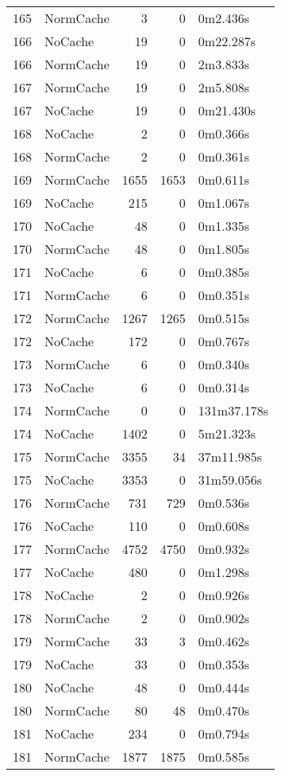 \begin{tabular}{llrrl}
165 & NormCache & 3 & 0 & 0m2.436s \\
166 & NoCache & 19 & 0 & 0m22.287s \\
166 & NormCache & 19 & 0 & 2m3.833s \\
167 & NormCache & 19 & 0 & 2m5.808s \\
167 & NoCache & 19 & 0 & 0m21.430s \\
168 & NoCache & 2 & 0 & 0m0.366s \\
168 & NormCache & 2 & 0 & 0m0.361s \\
169 & NormCache & 1655 & 1653 & 0m0.611s \\
169 & NoCache & 215 & 0 & 0m1.067s \\
170 & NoCache & 48 & 0 & 0m1.335s \\
170 & NormCache & 48 & 0 & 0m1.805s \\
171 & NoCache & 6 & 0 & 0m0.385s \\
171 & NormCache & 6 & 0 & 0m0.351s \\
172 & NormCache & 1267 & 1265 & 0m0.515s \\
172 & NoCache & 172 & 0 & 0m0.767s \\
173 & NormCache & 6 & 0 & 0m0.340s \\
173 & NoCache & 6 & 0 & 0m0.314s \\
174 & NormCache & 0 & 0 & 131m37.178s \\
174 & NoCache & 1402 & 0 & 5m21.323s \\
175 & NormCache & 3355 & 34 & 37m11.985s \\
175 & NoCache & 3353 & 0 & 31m59.056s \\
176 & NormCache & 731 & 729 & 0m0.536s \\
176 & NoCache & 110 & 0 & 0m0.608s \\
177 & NormCache & 4752 & 4750 & 0m0.932s \\
177 & NoCache & 480 & 0 & 0m1.298s \\
178 & NoCache & 2 & 0 & 0m0.926s \\
178 & NormCache & 2 & 0 & 0m0.902s \\
179 & NormCache & 33 & 3 & 0m0.462s \\
179 & NoCache & 33 & 0 & 0m0.353s \\
180 & NoCache & 48 & 0 & 0m0.444s \\
180 & NormCache & 80 & 48 & 0m0.470s \\
181 & NoCache & 234 & 0 & 0m0.794s \\
181 & NormCache & 1877 & 1875 & 0m0.585s \\

\end{tabular}
